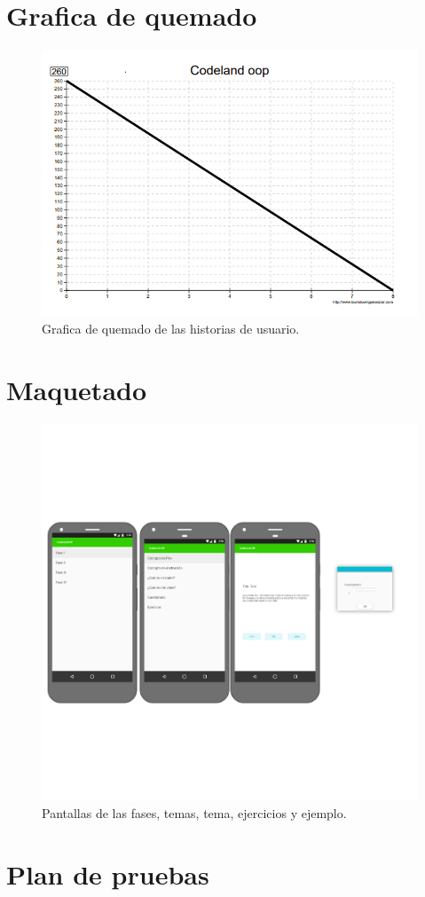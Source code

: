 \section{Grafica de quemado}
\begin{figure}[H]
	\begin{center}
		\includegraphics[scale=0.7]{img/quemado.png} 
		\caption{Grafica de quemado de las historias de usuario.}
		\label{quemado}
	\end{center}
\end{figure}

\section{Maquetado}
\begin{figure}[H]
\begin{center}
\includegraphics[scale=0.2]{img/pantallas1.png} 
\end{center}
\caption{Pantallas de las fases, temas, tema, ejercicios y ejemplo.}
\end{figure}

\section{Plan de pruebas}
